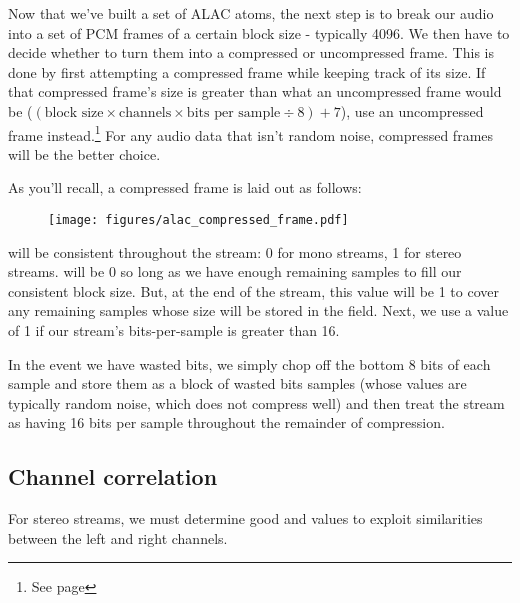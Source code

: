 Now that we've built a set of ALAC atoms, the next step is to break
our audio into a set of PCM frames of a certain block size -
typically 4096.
We then have to decide whether to turn them into a compressed
or uncompressed frame.
This is done by first attempting a compressed frame while keeping
track of its size.
If that compressed frame's size is greater than what an
uncompressed frame would be
($(\text{block size} \times \text{channels} \times \text{bits per sample} \div 8) + 7$), use an uncompressed frame instead.\footnote{See page \pageref{alac_uncompressed}}
For any audio data that isn't random noise, compressed frames
will be the better choice.

As you'll recall, a compressed frame is laid out as follows:

\begin{figure}[h]
\texttt{[image: figures/alac\_compressed\_frame.pdf]}
\end{figure}
\par
\noindent
{} will be consistent throughout the stream:
0 for mono streams, 1 for stereo streams.
 will be 0 so long as we have enough
remaining samples to fill our consistent block size.
But, at the end of the stream, this value will be 1 to cover any
remaining samples whose size will be stored in the  field.
Next, we use a  value of 1 if our stream's bits-per-sample
is greater than 16.

In the event we have wasted bits, we simply chop off the bottom 8 bits
of each sample and store them as a block of wasted bits samples
(whose values are typically random noise, which does not compress well)
and then treat the stream as having 16 bits per sample
throughout the remainder of compression.

\clearpage

\subsection{Channel correlation}

For stereo streams, we must determine good 
and  values to exploit similarities
between the left and right channels.


